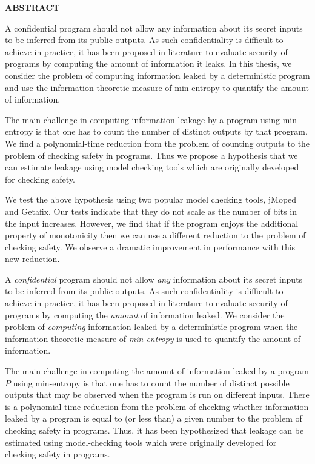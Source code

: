 \newpage
{}

\centerline{\bf \large ABSTRACT}
\vskip 10mm 

A confidential program should not allow any information about its secret inputs to be inferred from its public outputs. As such confidentiality is difficult to achieve in practice, it has been proposed in literature to evaluate security of programs by computing the amount of information it leaks. In this thesis, we consider the problem of computing information leaked by a deterministic program and use the information-theoretic measure of min-entropy to quantify the amount of information.

The main challenge in computing information leakage by a program using min-entropy is that one has to count the number of distinct outputs by that program. We find a polynomial-time reduction from the problem of counting outputs to the problem of checking safety in programs. Thus we propose a hypothesis that we can estimate leakage using model checking tools which are originally developed for checking safety.

We test the above hypothesis using two popular model checking tools, jMoped and Getafix. Our tests indicate that they do not scale as the number of bits in the input increases. However, we find that if the program enjoys the additional property of monotonicity then we can use a different reduction to the problem of checking safety. We observe a dramatic improvement in performance with this new reduction.

\iffalse

A \emph{confidential} program should not allow \emph{any} information about its secret inputs to be inferred from its public outputs.  As such confidentiality is difficult to achieve in practice, it has been proposed in literature to evaluate security of programs by computing the \emph{amount} of information leaked. %
We consider the problem of \emph{computing} 
information leaked by a deterministic  program  when the information-theoretic measure of \emph{min-entropy} is used to quantify the amount of information. 

The main challenge in computing the amount of  information leaked by a program $P$ using min-entropy is that one has to count the number of distinct possible outputs that may be observed when the program is run on different inputs. There is a polynomial-time reduction from the problem of checking whether information leaked by a program is equal to  (or less than) a given number to the problem of checking safety in  programs.  Thus, %
it has been hypothesized that leakage can be estimated using model-checking tools which were  originally developed for checking safety in programs.  
 
